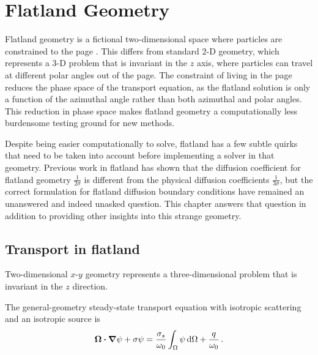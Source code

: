 
\chapter{Flatland Geometry}

Flatland geometry is a fictional two-dimensional space where particles are
constrained to the page \cite{Abb1884,Asa2008}. This differs from standard 2-D
geometry, which represents a 3-D problem that is invariant in the $z$ axis,
where particles can travel at different polar angles out of the page. The
constraint of living in the page reduces the phase space of the transport
equation, as the flatland solution is only a function of the azimuthal angle
rather than both azimuthal and polar angles. This reduction in phase space makes 
flatland geometry a computationally less burdensome testing ground for new
methods.

Despite being easier computationally to solve, flatland has a few subtle quirks
that need to be taken into account before implementing a solver in that
geometry. Previous work in flatland \cite{Asa2008,Lar2009c} has shown that the
diffusion coefficient for flatland geometry $\frac{1}{2\sigma}$ is different from
the physical diffusion coefficients $\frac{1}{3\sigma}$, but the correct
formulation for flatland diffusion boundary
conditions have remained an unanswered and indeed unasked question. This
chapter answers that question in addition to providing other insights into this
strange geometry.

\section{Transport in flatland}

Two-dimensional $x$-$y$ geometry represents a three-dimensional problem that is
invariant in the $z$ direction. 

The general-geometry steady-state transport equation with isotropic scattering
and an isotropic source is
\begin{equation}\label{eq:generalTransport}
  \bm{\Omega}\bm{\cdot} \bm{\nabla} \psi + \sigma \psi
  = \frac{\sigma_s}{\omega_0} \int_{\Omega} \psi \mathop{}\!\mathrm{d}\Omega + \frac{q}{\omega_0} \,.
\end{equation}

